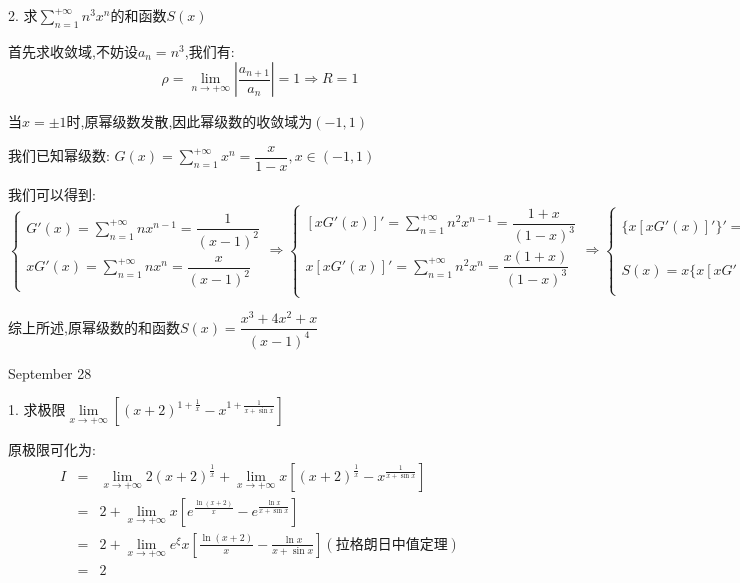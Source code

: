 2. 求$\sum\limits_{n=1}^{+\infty}n^3x^n$的和函数$S(x)$
\begin{solution}

	首先求收敛域,不妨设$a_{n}=n^3$,我们有:  
	$$\rho=\lim\limits_{n\to +\infty}|\dfrac{a_{n+1}}{a_{n}}|=1\Rightarrow R=1$$
	
	当$x=\pm 1$时,原幂级数发散,因此幂级数的收敛域为$(-1,1)$
	
	我们已知幂级数:  $G(x)=\sum\limits_{n=1}^{+\infty}x^{n}=\dfrac{x}{1-x},x\in(-1,1)$
	
	我们可以得到:  
	$$\left\lbrace
	\begin{array}{l}
		G'(x)=\sum\limits_{n=1}^{+\infty}nx^{n-1}=\dfrac{1}{(x-1)^2}\\
		xG'(x)=\sum\limits_{n=1}^{+\infty}nx^{n}=\dfrac{x}{(x-1)^2}
	\end{array}
	\right.\Rightarrow \left\lbrace
	\begin{array}{l}
		[xG'(x)]'=\sum\limits_{n=1}^{+\infty}n^2x^{n-1}=\dfrac{1+x}{(1-x)^3}\\
		x[xG'(x)]'=\sum\limits_{n=1}^{+\infty}n^2x^{n}=\dfrac{x(1+x)}{(1-x)^3}\\
	\end{array}
	\right.\Rightarrow \left\lbrace
	\begin{array}{l}
		\{x[xG'(x)]'\}'=\sum\limits_{n=1}^{+\infty}n^3x^{n-1}=\dfrac{x^2+4x+1}{(x-1)^4}\\
		S(x)=x\{x[xG'(x)]'\}'=\dfrac{x^3+4x^2+x}{(x-1)^4}
	\end{array}
	\right. $$
	
	综上所述,原幂级数的和函数$S(x)=\dfrac{x^3+4x^2+x}{(x-1)^4}$
\end{solution}

\textcolor{purplea}{September 28}

1. 求极限$\lim\limits_{x\to +\infty}\left[(x+2)^{1+\frac{1}{x}}-x^{1+\frac{1}{x+\sin x}}\right]$
\begin{solution}

	原极限可化为:  
	\begin{eqnarray*}
		I&=&\lim\limits_{x\to +\infty}2(x+2)^{\frac{1}{x}}+\lim\limits_{x\to +\infty}x\left[(x+2)^{\frac{1}{x}}-x^{\frac{1}{x+\sin x}}\right]\\
		&=&2+\lim\limits_{x\to +\infty}x\left[e^{\frac{\ln(x+2)}{x}}-e^{\frac{\ln x}{x+\sin x}}\right]\\
		&=&2+\lim\limits_{x\to +\infty}e^{\xi}x[\frac{\ln(x+2)}{x}-\frac{\ln x}{x+\sin x}](\text{拉格朗日中值定理})\\
		&=&2
	\end{eqnarray*}
\end{solution}


